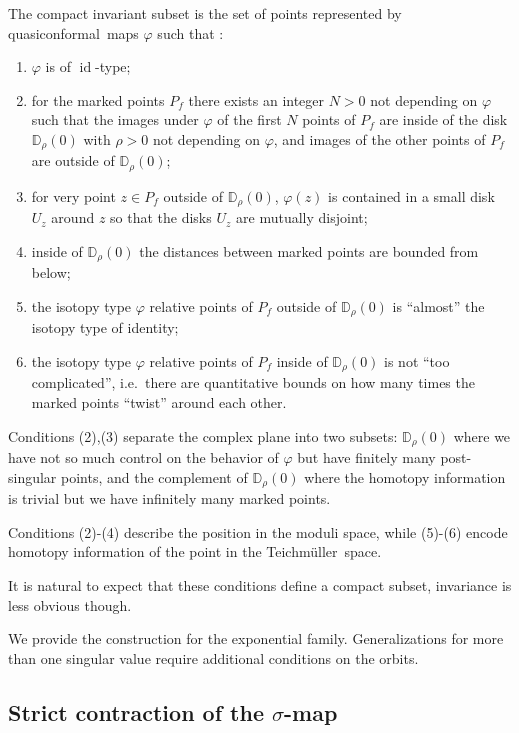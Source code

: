 \documentclass[10pt,reqno,a4paper]{amsart}
\numberwithin{figure}{section}
\numberwithin{equation}{section}
\newcommand{\tei}{Teichm\"uller}
\newcommand{\qc}{quasiconformal}
\newcommand{\idt}{of $\id$-type}
\newcommand{\id}{\operatorname{id}}
\begin{document}
The compact invariant subset is the set of points represented by \qc\ maps $\varphi$ such that :
\begin{enumerate}
	\item $\varphi$ is \idt;
	\item for the marked points $P_f$ there exists an integer $N>0$ not depending on $\varphi$ such that the images under $\varphi$ of the first $N$ points of $P_f$ are inside of the disk $\mathbb{D}_\rho(0)$ with $\rho>0$ not depending on $\varphi$, and images of the other points of $P_f$ are outside of $\mathbb{D}_\rho(0)$;
	\item for very point $z\in P_f$ outside of $\mathbb{D}_\rho(0)$, $\varphi(z)$ is contained in a small disk $U_z$ around $z$ so that the disks $U_z$ are mutually disjoint; 
	\item inside of $\mathbb{D}_\rho(0)$ the distances between marked points are bounded from below;
	\item the isotopy type $\varphi$ relative points of $P_f$ outside of $\mathbb{D}_\rho(0)$ is ``almost'' the isotopy type of identity; 
	\item the isotopy type $\varphi$ relative points of $P_f$ inside of $\mathbb{D}_\rho(0)$ is not ``too complicated'', i.e.\ there are quantitative bounds on how many times the marked points ``twist'' around each other.
\end{enumerate}

Conditions (2),(3) separate the complex plane into two subsets: $\mathbb{D}_\rho(0)$ where we have not so much control on the behavior of $\varphi$ but have finitely many post-singular points, and the complement of $\mathbb{D}_\rho(0)$ where the homotopy information is trivial but we have infinitely many marked points.

Conditions (2)-(4) describe the position in the moduli space, while (5)-(6) encode homotopy information of the point in the \tei\ space.

It is natural to expect that these conditions define a compact subset, invariance is less obvious though.

We provide the construction for the exponential family. Generalizations for more than one singular value require additional conditions on the orbits. 

\subsection*{Strict contraction of the $\sigma$-map}
\end{document}
